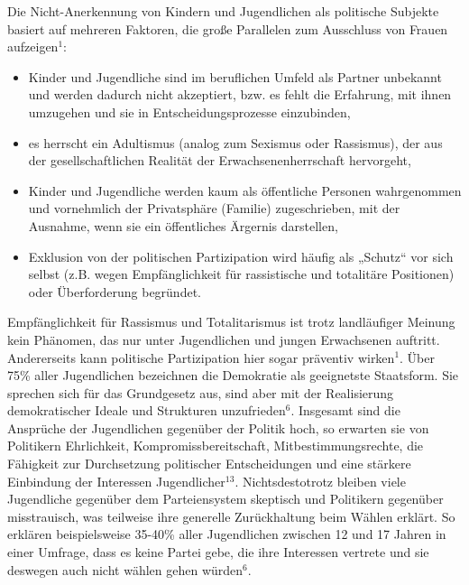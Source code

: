 {Die Nicht-Anerkennung von Kindern und Jugendlichen als politische Subjekte basiert auf mehreren Faktoren, die große Parallelen zum Ausschluss von Frauen aufzeigen$^1$:

\begin{itemize}
\item Kinder und Jugendliche sind im beruflichen Umfeld als Partner unbekannt und werden dadurch nicht akzeptiert, bzw. es fehlt die Erfahrung, mit ihnen umzugehen und sie in Entscheidungsprozesse einzubinden,
\item es herrscht ein Adultismus (analog zum Sexismus oder Rassismus), der aus der gesellschaftlichen Realität der Erwachsenenherrschaft hervorgeht,
\item Kinder und Jugendliche werden kaum als öffentliche Personen wahrgenommen und vornehmlich der Privatsphäre (Familie) zugeschrieben, mit der Ausnahme, wenn sie ein öffentliches Ärgernis darstellen,
\item Exklusion von der politischen Partizipation wird häufig als „Schutz“ vor sich selbst (z.B. wegen Empfänglichkeit für rassistische und totalitäre Positionen) oder Überforderung begründet.
\end{itemize}

Empfänglichkeit für Rassismus und Totalitarismus ist trotz landläufiger Meinung kein Phänomen, das nur unter Jugendlichen und jungen Erwachsenen auftritt. Andererseits kann politische Partizipation hier sogar präventiv wirken$^1$. Über 75\% aller Jugendlichen bezeichnen die Demokratie als geeignetste Staatsform. Sie sprechen sich für das Grundgesetz aus, sind aber mit der Realisierung demokratischer Ideale und Strukturen unzufrieden$^6$. Insgesamt sind die Ansprüche der Jugendlichen gegenüber der Politik hoch, so erwarten sie von Politikern Ehrlichkeit, Kompromissbereitschaft, Mitbestimmungsrechte, die Fähigkeit zur Durchsetzung politischer Entscheidungen und eine stärkere Einbindung der Interessen Jugendlicher$^{13}$. Nichtsdestotrotz bleiben viele Jugendliche gegenüber dem Parteiensystem skeptisch und Politikern gegenüber misstrauisch, was teilweise ihre generelle Zurückhaltung beim Wählen erklärt. So erklären beispielsweise 35-40\% aller Jugendlichen zwischen 12 und 17 Jahren in einer Umfrage, dass es keine Partei gebe, die ihre Interessen vertrete und sie deswegen auch nicht wählen gehen würden$^6$.

}
